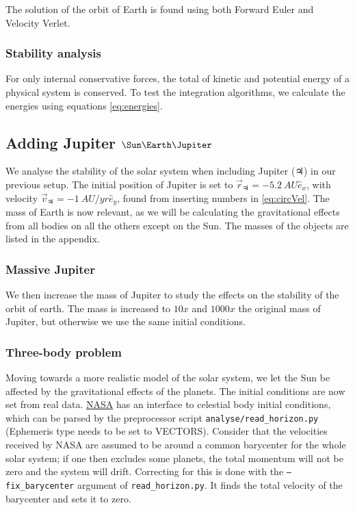 \documentclass[10pt]{article}
\begin{document}
\begin{multicols}{2}
The solution of the orbit of Earth is found using both Forward Euler and
Velocity Verlet. 

\subsubsection{Stability analysis}
For only internal conservative forces, the total of kinetic and potential
energy of a physical system is conserved.  To test the integration algorithms, 
we calculate the energies using equations \cref{eq:energies}.

\subsection{Adding Jupiter \texorpdfstring{$\Sun\Earth\Jupiter$}{}}

We analyse the stability of the solar system when including Jupiter
($\Jupiter$) in our previous setup. The initial position of Jupiter is set to
$\vec r_\Jupiter = -\SI{5.2}{AU}\hat e_x$, with velocity $\vec v_\Jupiter =
-\SI{1}{AU/yr}\hat e_y$, found from inserting numbers in \cref{eq:circVel}.
The mass of Earth is now relevant, as we will be calculating the
gravitational effects from all bodies on all the others except on the Sun.
The masses of the objects are listed in the appendix.

\subsubsection{Massive Jupiter }
We then increase the mass of Jupiter to study the effects on the stability
of the orbit of earth. The mass is increased to $10x$ and $1000x$ the
original mass of Jupiter, but otherwise we use the same initial conditions.

\subsubsection{Three-body problem} 
Moving towards a more realistic model of the solar system, we let the Sun
be affected by the gravitational effects of the planets. The initial
conditions are now set from real data.
\href{https://ssd.jpl.nasa.gov/horizons.cgi}{NASA} has an interface to
celestial body initial conditions, which can be parsed by the preprocessor
script \texttt{analyse/read\_horizon.py} (Ephemeris type needs to be set to
VECTORS).  Consider that the velocities received by NASA are assumed to be
around a common barycenter for the whole solar system; if one then excludes
some planets, the total momentum will not be zero and the system will
drift.  
Correcting for this is done with the \texttt{--fix\_barycenter} argument of
\texttt{read\_horizon.py}. It finds the total velocity of the barycenter
and sets it to zero.



\end{multicols}
\end{document}
